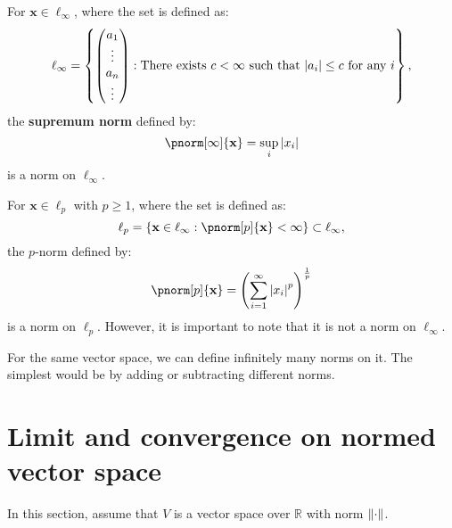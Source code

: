 \documentclass{huhtakm-template-book-v2}
\begin{document}
    \begin{eg}
        For $\mathbf{x} \in \ell_{\infty}$, where the set is defined as:
        \begin{equation*}
            \ell_{\infty} = \left\{\begin{pmatrix}
                a_{1}\\
                \vdots\\
                a_{n}\\
                \vdots
            \end{pmatrix} : \text{There exists $c < \infty$ such that $\left|{a_{i}}\right| \leq c$ for any $i$}\right\},
        \end{equation*}
        the \textbf{supremum norm} defined by:
        \begin{equation*}
            \pnorm[\infty]{\mathbf{x}} = \sup_{i}\abs{x_{i}}
        \end{equation*}
        is a norm on $\ell_{\infty}$.
    \end{eg}
    \begin{eg}
        For $\mathbf{x} \in \ell_{p}$ with $p\geq 1$, where the set is defined as:
        \begin{equation*}
            \ell_{p} = \{\mathbf{x} \in \ell_{\infty} : \pnorm[p]{\mathbf{x}} < \infty\} \subset \ell_{\infty},
        \end{equation*}
        the $p$-norm defined by:
        \begin{equation*}
            \pnorm[p]{\mathbf{x}} = \left(\sum_{i=1}^{\infty}\abs{x_{i}}^{p}\right)^{\frac{1}{p}}
        \end{equation*}
        is a norm on $\ell_{p}$. However, it is important to note that it is not a norm on $\ell_{\infty}$.
    \end{eg}
    \begin{rem}
        For the same vector space, we can define infinitely many norms on it. The simplest would be by adding or subtracting different norms.
    \end{rem}
    \newpage
    
\section{Limit and convergence on normed vector space}
    In this section, assume that $V$ is a vector space over $\mathbb{R}$ with norm $\lVert{\cdot}\rVert$.
\end{document}
